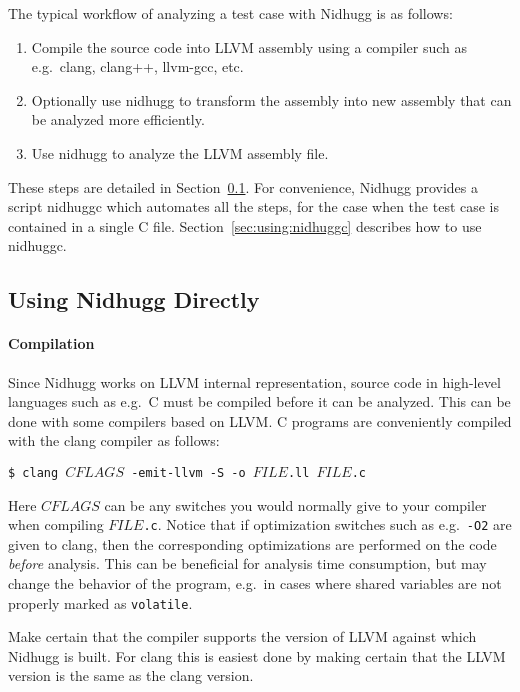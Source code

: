 \documentclass[a4paper]{article}
\begin{document}
The typical workflow of analyzing a test case with Nidhugg is as
follows:

\begin{enumerate}
\item Compile the source code into LLVM assembly using a compiler
  such as e.g.\ clang, clang++, llvm-gcc, etc.
\item Optionally use \textsf{nidhugg} to transform the assembly into
  new assembly that can be analyzed more efficiently.
\item Use \textsf{nidhugg} to analyze the LLVM assembly file.
\end{enumerate}

These steps are detailed in
Section~\ref{sec:using:nidhugg:directly}. For convenience, Nidhugg
provides a script \textsf{nidhuggc} which automates all the steps, for
the case when the test case is contained in a single C
file. Section~\ref{sec:using:nidhuggc} describes how to use
\textsf{nidhuggc}.

\subsection{Using Nidhugg Directly}\label{sec:using:nidhugg:directly}

\paragraph{Compilation}
%
Since Nidhugg works on LLVM internal representation, source code in
high-level languages such as e.g.\ C must be compiled before it can be
analyzed. This can be done with some compilers based on LLVM. C
programs are conveniently compiled with the \textsf{clang} compiler as
follows:

\vspace{5pt}
\noindent
\texttt{\$ clang $CFLAGS$ -emit-llvm -S -o $FILE$.ll $FILE$.c}

\vspace{5pt}\noindent
%
Here $CFLAGS$ can be any switches you would normally give to your
compiler when compiling \texttt{$FILE$.c}. Notice that if optimization
switches such as e.g.\ \texttt{-O2} are given to \textsf{clang}, then
the corresponding optimizations are performed on the code
\emph{before} analysis. This can be beneficial for analysis time
consumption, but may change the behavior of the program, e.g.\ in cases
where shared variables are not properly marked as \texttt{volatile}.

Make certain that the compiler supports the version of LLVM against
which Nidhugg is built. For \textsf{clang} this is easiest done by
making certain that the LLVM version is the same as the \textsf{clang}
version.
\end{document}
